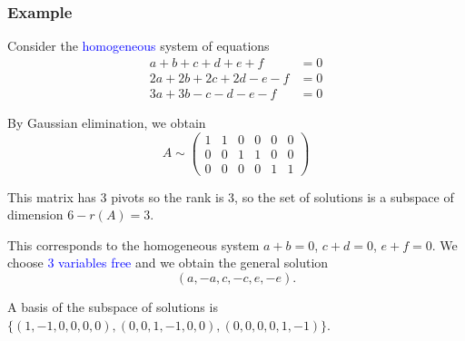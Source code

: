 \documentclass[11pt,aspectratio=169]{beamer}
\begin{document}
\begin{frame}
\frametitle{Example}
\begin{small}
Consider the \textcolor{blue}{homogeneous} system of equations
\begin{equation*}
\begin{split}
a+b+c+d+e+f&=0   \\
2a+2b+2c+2d-e-f&=0 \\
3a+3b-c-d-e-f&=0 
\end{split}
\end{equation*}

By Gaussian elimination, we obtain
\begin{equation*}
A\sim\begin{pmatrix}
1&1&0&0&0&0\\
0&0&1&1&0&0\\
0&0&0&0&1&1 \end{pmatrix} 
\end{equation*}
\begin{tiny}This matrix has 3 pivots so  the rank is 3, so  the set of solutions is a subspace of dimension $6-r(A)=3$.\end{tiny}

This corresponds to the homogeneous system $a+b=0$, $c+d=0$, $e+f=0$. We choose \textcolor{blue}{3 variables free} and we obtain the general solution
$$
(a, -a, c, -c, e, -e).
$$
 \begin{tiny}A basis of the subspace of solutions is $\{(1,-1,0,0,0,0),(0,0,1,-1,0,0), (0,0,0,0,1,-1)  \}$.
 \end{tiny}



\end{small}
\end{frame}
\end{document}
